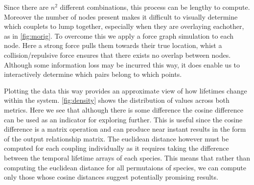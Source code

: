 \documentclass{pasa}%
\begin{document}
Since there are $n^2$ different combinations, this process can be lengthy to compute. Moreover the number of nodes present makes it difficult to visually determine which couplets to lump together, especially when they are overlaying eachother, as in \autoref{fig:morig}. To overcome this we apply a force graph simulation to each node. Here a strong force pulls them towards their true location, whist a collision/repulsive force ensures that there exists no overlap between nodes. Although some information loss may be incurred this way, it does enable us to interactively determine which pairs belong to which points.   

Plotting the data this way provides an approximate view of how lifetimes change within the system. \autoref{fig:density} shows the distribution of values across both metrics. Here we see that although there is some difference the cosine difference can be used as an indicator for exploring further. This is useful since the cosine difference is a matrix operation and can produce near instant results in the form of the output relationship matrix. The euclidean distance however must be computed for each coupling individually as it requires taking the difference between the temporal lifetime arrays of each species. This means that rather than computing the euclidean distance for all permutaions of species, we can compute only those whose cosine distances suggest potentially promising results.  
\end{document}
